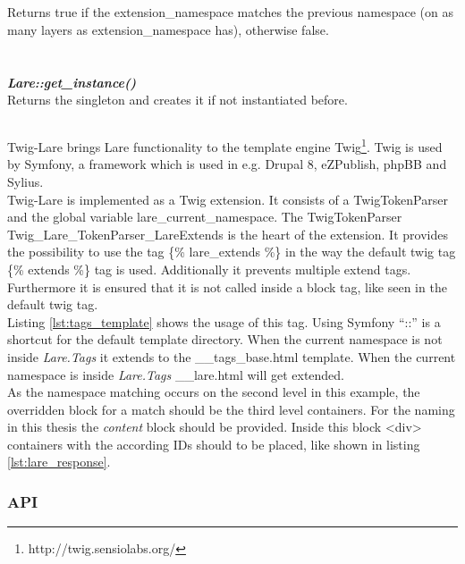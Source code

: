 \\
\\
Returns true if the extension\_namespace matches the previous namespace (on as many layers as extension\_namespace has), otherwise false.
\\
\\
\\
\large{\textbf{\textit{Lare::get\_instance()}}}
\\
Returns the \lare{} singleton and creates it if not instantiated before.

\subsection{\twigLare{}}
Twig-Lare brings Lare functionality to the template engine Twig\footnote{http://twig.sensiolabs.org/}.
Twig is used by Symfony, a framework which is used in e.g. Drupal 8, eZPublish, phpBB and Sylius.
\\
Twig-Lare is implemented as a Twig extension.
It consists of a TwigTokenParser and the global variable lare\_current\_namespace.
The TwigTokenParser
\\
Twig\_Lare\_TokenParser\_LareExtends is the heart of the extension.
It provides the possibility to use the tag \{\% lare\_extends \%\} in the way the default twig tag \{\% extends \%\} tag is used.
Additionally it prevents multiple extend tags.
Furthermore it is ensured that it is not called inside a block tag, like seen in the default twig tag.
\\
Listing \ref{lst:tags_template} shows the usage of this tag.
Using Symfony \enquote{::} is a shortcut for the default template directory.
When the current namespace is not inside \emph{Lare.Tags} it extends to the \_\_tags\_base.html template.
When the current namespace is inside \emph{Lare.Tags} \_\_lare.html will get extended.
\\
As the namespace matching occurs on the second level in this example, the overridden block for a match should be the third level containers.
For the naming in this thesis the \emph{content} block should be provided.
Inside this block <div> containers with the according IDs should to be placed, like shown in listing \ref{lst:lare_response}.

\subsubsection{API}

